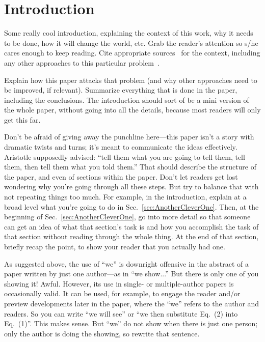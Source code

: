\documentclass[reprint, aps, prd, letterpaper, noshowpacs, amsmath, %
amssymb, amsfonts, nofootinbib, floatfix, superscriptaddress, %
twoside]{revtex4-1}
\begin{document}
\section{Introduction}
\label{sec:Introduction}

Some really cool introduction, explaining the context of this work,
why it needs to be done, how it will change the world, etc.  Grab the
reader's attention so s/he cares enough to keep reading.  Cite
appropriate sources~\cite{MTW, Wald:1984} for the context, including
any other approaches to this particular
problem~\cite{doranlasenby:2003}.

Explain how this paper attacks that problem (and why other approaches
need to be improved, if relevant).  Summarize everything that is done
in the paper, including the conclusions.  The introduction should sort
of be a mini version of the whole paper, without going into all the
details, because most readers will only get this far.

Don't be afraid of giving away the punchline here---this paper isn't a
story with dramatic twists and turns; it's meant to communicate the
ideas effectively.  Aristotle supposedly advised: ``tell them what you
are going to tell them, tell them, then tell them what you told
them.''  That should describe the structure of the paper, and even of
sections within the paper.  Don't let readers get lost wondering why
you're going through all these steps.  But try to balance that with
not repeating things too much.  For example, in the introduction,
explain at a broad level what you're going to do in
Sec.~\ref{sec:AnotherCleverOne}.  Then, at the beginning of
Sec.~\ref{sec:AnotherCleverOne}, go into more detail so that someone
can get an idea of what that section's task is and how you accomplish
the task of that section without reading through the whole thing.  At
the end of that section, briefly recap the point, to show your reader
that you actually had one.

As suggested above, the use of ``we'' is downright offensive in the
abstract of a paper written by just one author---as in ``we show...''
But there is only one of you showing it!  Awful.  However, its use in
single- or multiple-author papers is occasionally valid.  It can be
used, for example, to engage the reader and/or preview developments
later in the paper, where the ``we'' refers to the author and
readers.  So you can write ``we will see'' or ``we then substitute
Eq.~(2) into Eq.~(1)''.  This makes sense.  But ``we'' do not show
when there is just one person; only the author is doing the showing,
so rewrite that sentence.
\end{document}
